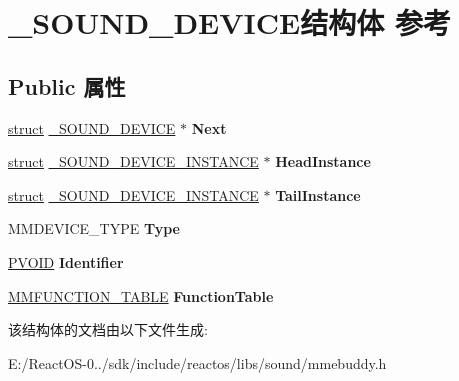 \hypertarget{struct___s_o_u_n_d___d_e_v_i_c_e}{}\section{\+\_\+\+S\+O\+U\+N\+D\+\_\+\+D\+E\+V\+I\+C\+E结构体 参考}
\label{struct___s_o_u_n_d___d_e_v_i_c_e}
\subsection*{Public 属性}
\begin{DoxyCompactItemize}
\item 
\mbox{\label{struct___s_o_u_n_d___d_e_v_i_c_e_a9285d4808feb71b53f9efced7ac09e37}} 
\hyperlink{interfacestruct}{struct} \hyperlink{struct___s_o_u_n_d___d_e_v_i_c_e}{\+\_\+\+S\+O\+U\+N\+D\+\_\+\+D\+E\+V\+I\+CE} $\ast$ {\bfseries Next}
\item 
\mbox{\label{struct___s_o_u_n_d___d_e_v_i_c_e_a54ca376954f1be6318dad3f7d54399be}} 
\hyperlink{interfacestruct}{struct} \hyperlink{struct___s_o_u_n_d___d_e_v_i_c_e___i_n_s_t_a_n_c_e}{\+\_\+\+S\+O\+U\+N\+D\+\_\+\+D\+E\+V\+I\+C\+E\+\_\+\+I\+N\+S\+T\+A\+N\+CE} $\ast$ {\bfseries Head\+Instance}
\item 
\mbox{\label{struct___s_o_u_n_d___d_e_v_i_c_e_adee57bbb1e8cfbcdd083392232b48db9}} 
\hyperlink{interfacestruct}{struct} \hyperlink{struct___s_o_u_n_d___d_e_v_i_c_e___i_n_s_t_a_n_c_e}{\+\_\+\+S\+O\+U\+N\+D\+\_\+\+D\+E\+V\+I\+C\+E\+\_\+\+I\+N\+S\+T\+A\+N\+CE} $\ast$ {\bfseries Tail\+Instance}
\item 
\mbox{\label{struct___s_o_u_n_d___d_e_v_i_c_e_a655952d16651c0b1d355b19c0e5b3434}} 
M\+M\+D\+E\+V\+I\+C\+E\+\_\+\+T\+Y\+PE {\bfseries Type}
\item 
\mbox{\label{struct___s_o_u_n_d___d_e_v_i_c_e_a3d634b06625228d08d3a4e4db8c711f2}} 
\hyperlink{interfacevoid}{P\+V\+O\+ID} {\bfseries Identifier}
\item 
\mbox{\label{struct___s_o_u_n_d___d_e_v_i_c_e_a3fd3bf0a27cf7f4204bfa873445ab261}} 
\hyperlink{struct___m_m_f_u_n_c_t_i_o_n___t_a_b_l_e}{M\+M\+F\+U\+N\+C\+T\+I\+O\+N\+\_\+\+T\+A\+B\+LE} {\bfseries Function\+Table}
\end{DoxyCompactItemize}


该结构体的文档由以下文件生成\+:\begin{DoxyCompactItemize}
\item 
E\+:/\+React\+O\+S-\/0../sdk/include/reactos/libs/sound/mmebuddy.\+h\end{DoxyCompactItemize}
